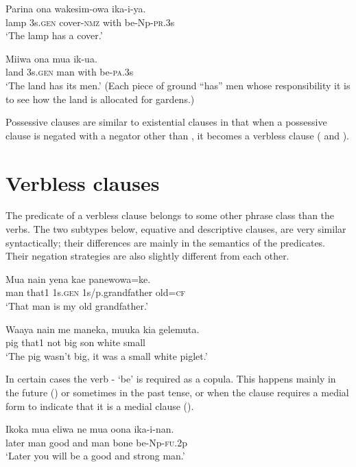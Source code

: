 \ea%
\label{ex:x1807}
\gll Parina  ona  wakesim-owa    ika-i-ya. \\
     lamp  3s.\textsc{gen}  cover-\textsc{nmz}  with  be-Np-\textsc{pr}.3s \\
\glt `The lamp has a cover.'
\z

\ea%
\label{ex:x1810}
\gll Miiwa  ona  mua    ik-ua. \\
     land  3s.\textsc{gen}  man  with  be-\textsc{pa}.3s \\
\glt `The land has its men.' (Each piece of ground ``has'' men whose responsibility it is to see how the land is allocated for gardens.)
\z

Possessive clauses are similar to existential clauses in that when a possessive clause is negated with a negator other than , it becomes a verbless clause ( and ).

\section{Verbless clauses}
{}
The predicate of a verbless clause belongs to some other phrase class than the verbs. The two subtypes below, equative and descriptive clauses, are very similar syntactically; their differences are mainly in the semantics of the predicates. Their negation strategies are also slightly different from each other. 

\ea%
\label{ex:x1036}
\gll Mua  nain  yena  kae  panewowa=ke. \\
     man  that1  1s.\textsc{gen}  1s/p.grandfather  old=\textsc{cf} \\
\glt `That man is my old grandfather.'
\z

\ea%
\label{ex:x1037}
\gll Waaya  nain  me  maneka,  muuka  kia  gelemuta. \\
     pig  that1  not  big  son  white  small \\
\glt `The pig wasn't big, it was a small white piglet.'
\z

In certain cases the verb - `be' is required as a copula. This happens mainly in the future () or sometimes in the past tense, or when the clause requires a medial form to indicate that it is a medial clause (). 

\ea%
\label{ex:x986}
\gll Ikoka  mua  eliwa  ne  mua  oona  ika-i-nan. \\
     later  man  good  and  man  bone  be-Np-\textsc{fu}.2p \\
\glt `Later you will be a good and strong man.'
\z


